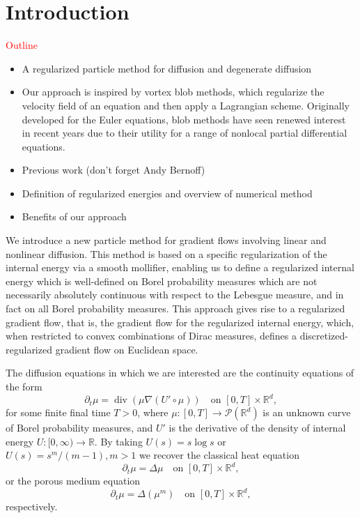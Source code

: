 \documentclass[11pt,leqno]{amsart}
\theoremstyle{definition}
\newcommand{\be}{\begin{equation}}
\newcommand{\ee}{\end{equation}}
\newcommand{\bes}{\begin{equation*}}
\newcommand{\ees}{\end{equation*}}
\newcommand{\R}{{\mathord{\mathbb R}}}
\newcommand{\grad}{\nabla}
\def\P{{\mathcal P}}
\DeclareMathOperator{\dive}{div}
\begin{document}
\section{Introduction}
\textcolor{red}{Outline}
\begin{itemize}
\item A regularized particle method for diffusion and degenerate diffusion
\item Our approach is inspired by vortex blob methods, which regularize the velocity field of an equation and then apply a Lagrangian scheme. Originally developed for the Euler equations, blob methods have seen renewed interest in recent years due to their utility for a range of nonlocal partial differential equations.
\item Previous work (don't forget Andy Bernoff)
\item Definition of regularized energies and overview of numerical method
\item Benefits of our approach
\end{itemize}


We introduce a new particle method for gradient flows involving linear and nonlinear diffusion. This method is based on a specific regularization of the internal energy via a smooth mollifier, enabling us to define a regularized internal energy which is well-defined on Borel probability measures which are not necessarily absolutely continuous with respect to the Lebesgue measure, and in fact on all Borel probability measures. This approach gives rise to a regularized gradient flow, that is, the gradient flow for the regularized internal energy, which, when restricted to convex combinations of Dirac measures, defines a discretized-regularized gradient flow on Euclidean space.

The diffusion equations in which we are interested are the continuity equations of the form
\be\label{eq:diffusion-general}
	\partial_t\mu = \dive (\mu \grad (U'\circ\mu)) \quad \mbox{on $[0,T]\times\R^d$},
\ee
for some finite final time $T>0$, where $\mu\colon [0,T] \to \P(\R^d)$ is an unknown curve of Borel probability measures, and $U'$ is the derivative of the density of internal energy $U \colon [0,\infty) \to \R$. By taking $U(s) = s\log s$ or $U(s) = s^m/(m-1), m>1$ we recover the classical heat equation
\bes
	\partial_t\mu = \Delta \mu \quad \mbox{on $[0,T]\times\R^d$},
\ees
or the porous medium equation
\bes
	\partial_t\mu = \Delta (\mu^m) \quad \mbox{on $[0,T]\times\R^d$},
\ees
respectively.
\end{document}
